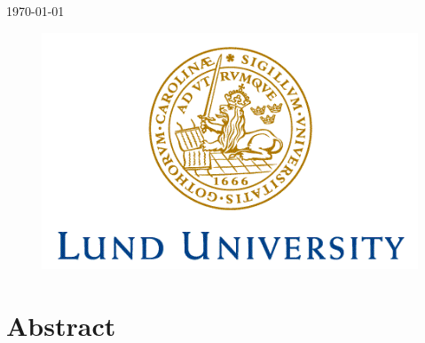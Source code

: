\documentclass[11pt,a4paper]{article}
\begin{document}
\begin{titlepage}


{\large \today}\\[2cm] %


\begin{figure}[!h]
\centering
\includegraphics[scale=0.6]{Logo.png}
\end{figure} %
 

\vfill %



\end{titlepage}


\newpage
\tableofcontents
\thispagestyle{empty}
\clearpage

\null\vfill
\section*{Abstract}
\end{document}
